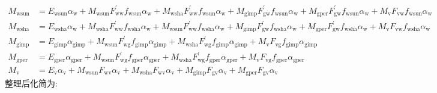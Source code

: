 \begin{landscape}
  \begin{equation}
    \begin{aligned}M_{\mathrm{wsun}} &=E_{\mathrm{wsun}} \alpha_{\mathrm{w}}+M_{\mathrm{wsun}} F_{\mathrm{ww}}^{\prime} f_{\mathrm{wsun}} \alpha_{\mathrm{w}}+M_{\mathrm{wsha}} F_{\mathrm{ww}}^{\prime} f_{\mathrm{wsun}} \alpha_{\mathrm{w}}+M_{\mathrm{gimp}} F_{\mathrm{g w}}^{\prime} f_{\mathrm{wsun}} \alpha_{\mathrm{w}}+M_{\mathrm{gper}} F_{\mathrm{g w}}^{\prime} f_{\mathrm{wsun}} \alpha_{\mathrm{w}}+M_{\mathrm{v}} F_{\mathrm{v w}} f_{\mathrm{wsun}} \alpha_{\mathrm{w}} \\ M_{\mathrm{wsha}} &=E_{\mathrm{wsha}} \alpha_{\mathrm{w}}+M_{\mathrm{wsha}} F_{\mathrm{ww}}^{\prime} f_{\mathrm{wsha}} \alpha_{\mathrm{w}}+M_{\mathrm{wsun}} F_{\mathrm{ww}}^{\prime} f_{\mathrm{wsha}} \alpha_{\mathrm{w}}+M_{\mathrm{gimp}} F_{\mathrm{g w}}^{\prime} f_{\mathrm{wsha}} \alpha_{\mathrm{w}}+M_{\mathrm{gper}} F_{\mathrm{g w}}^{\prime} f_{\mathrm{wsha}} \alpha_{\mathrm{w}}+M_{\mathrm{v}} F_{\mathrm{v w}} f_{\mathrm{wsha}} \alpha_{\mathrm{w}} \\ M_{\mathrm{gimp}} &=E_{\mathrm{gimp}} \alpha_{\mathrm{gimp}}+M_{\mathrm{wsun}} F_{\mathrm{w g}}^{\prime} f_{\mathrm{gimp}} \alpha_{\mathrm{gimp}}+M_{\mathrm{wsha}} F_{\mathrm{w g}}^{\prime} f_{\mathrm{gimp}} \alpha_{\mathrm{gimp}}+M_{\mathrm{v}} F_{\mathrm{v g}} f_{\mathrm{gimp}} \alpha_{\mathrm{gimp}} \\ M_{\mathrm{gper}} &=E_{\mathrm{gper}} \alpha_{\mathrm{gper}}+M_{\mathrm{wsun}} F_{\mathrm{w g}}^{\prime} f_{\mathrm{gper}} \alpha_{\mathrm{gper}}+M_{\mathrm{wsha}} F_{\mathrm{w g}}^{\prime} f_{\mathrm{gper}} \alpha_{\mathrm{gper}}+M_{\mathrm{v}} F_{\mathrm{v g}} f_{\mathrm{gper}} \alpha_{\mathrm{gper}} \\ M_{\mathrm{v}} &=E_{\mathrm{v}} \alpha_{\mathrm{v}}+M_{\mathrm{wsun}} F_{\mathrm{w v}} \alpha_{\mathrm{v}}+M_{\mathrm{wsha}} F_{\mathrm{w v}} \alpha_{\mathrm{v}}+M_{\mathrm{gimp}} F_{\mathrm{g v}} \alpha_{\mathrm{v}}+M_{\mathrm{gper}} F_{\mathrm{g v}} \alpha_{\mathrm{v}}\end{aligned}
  \end{equation}
  整理后化简为:
  \begin{equation}

\end{equation}
\end{landscape}
